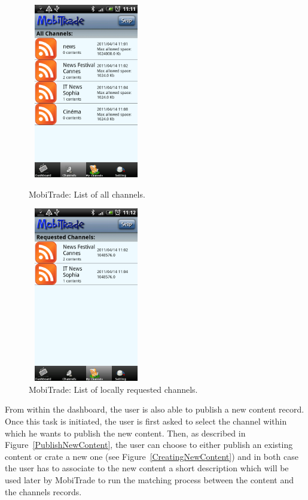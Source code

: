 \begin{figure}[!h]
\begin{minipage}[l]{0.3\linewidth}
\centering
\includegraphics[width=2in,height=3in]{Chapitre6/ListAllChannels.png}
\begin{minipage}[l]{1\linewidth}
\small
\caption{MobiTrade: List of all channels.}
\normalsize
\label{ListAllChannels}
\end{minipage}
\end{minipage}
\hspace{2.1cm}
\begin{minipage}[l]{0.3\linewidth}
\centering
\includegraphics[width=2in,height=3in]{Chapitre6/ListRequestedChannels.png}
\begin{minipage}[l]{1\linewidth}
\caption{MobiTrade: List of locally requested channels.}
\label{ListRequestedChannels}
\end{minipage}
\end{minipage}
\end{figure}

From within the dashboard, the user is also able to publish a new content record. Once this task is initiated, the user is first asked to select the channel within which he wants to publish the new content. Then, as described in Figure~\ref{PublishNewContent}, the user can choose to either publish an existing content or crate a new one (see Figure~\ref{CreatingNewContent}) and in both case the user has to associate to the new content a short description which will be used later by MobiTrade to run the matching process between the content  and the channels records.

